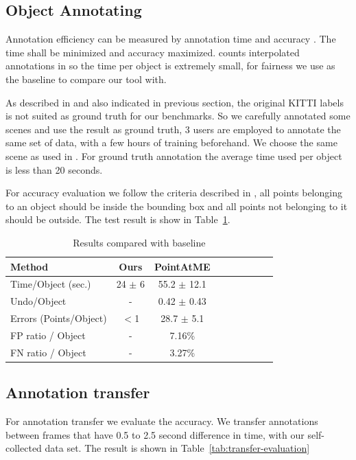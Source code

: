 \documentclass[letterpaper, 10 pt, conference]{ieeeconf}  %
\begin{document}
\subsection{Object Annotating}

Annotation efficiency can be measured by annotation time and accuracy\cite{pointatme} \cite{Zimmer20193DBA}. The time shall be minimized and accuracy maximized. \cite{Zimmer20193DBA} counts interpolated annotations in so the time per object is extremely small, for fairness we use \cite{pointatme} as the baseline to compare our tool with.

As described in \cite{pointatme} and also indicated in previous section, the original KITTI labels is not suited as ground truth for our benchmarks. So we carefully annotated some scenes and use the result as ground truth, 3 users are employed to annotate the same set of data, with a few hours of training beforehand. We choose the same scene as used in \cite{pointatme}. For ground truth annotation the average time used per object is less than 20 seconds.

For accuracy evaluation we follow the criteria  described in \cite{pointatme}, all points belonging to an object should be inside the bounding box and all points not belonging to it should be outside.
The test result is show in Table~\ref{tab:annotation-evaluation}.
\begin{table}[h]
	\centering
	\caption{Results compared with baseline}
	\label{tab:annotation-evaluation}
	\begin{tabular}{|l|c|c|c|c||c|c|c|c|}
		\hline
		\textbf{Method} & \textbf{Ours} & \textbf{PointAtME\cite{pointatme}} \\
		\hline
		\hline
		Time/Object (sec.) & 24 $\pm$ 6 & 55.2 $\pm$ 12.1\\
		\hline
		Undo/Object & - & 0.42 $\pm$ 0.43\\
		\hline
		Errors (Points/Object) & $<$1 & 28.7 $\pm$ 5.1\\
		\hline
		FP ratio / Object & - & 7.16\%\\
		\hline
		FN ratio / Object & - & 3.27\%\\
		\hline
	\end{tabular}
\end{table}


\subsection{Annotation transfer}
For annotation transfer we evaluate the accuracy. We  transfer annotations between frames that have 0.5 to 2.5 second difference in time, with our self-collected data set. The result is shown in Table~\ref{tab:transfer-evaluation}
\end{document}
